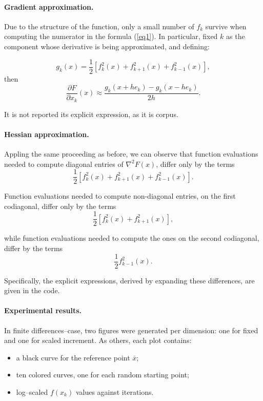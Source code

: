 \documentclass[a4paper,12pt]{article}
\begin{document}
	\vspace{1em}
	
		\paragraph{Gradient approximation.}Due to the structure of the function, only a small number of $f_{k}$ survive when computing the numerator in the formula (\ref{eq1}). In particular, fixed $k$ as the component whose derivative is being approximated, and defining:
	
	\[
	g_{k}(x) = \frac{1}{2}[f^{2}_{k}(x) + f^{2}_{k+1}(x) + f^{2}_{k-1}(x)],
	\]
	then
	\begin{equation}
		\frac{\partial F}{\partial x_{k}}(x) \approx	
			 \frac{g_{k}(x+he_{k}) - g_{k}(x-he_{k})}{2h}.
	\end{equation} 
	
	\noindent It is not reported its explicit expression, as it is corpus. 
	
	\paragraph{Hessian approximation.}
	Appling the same proceeding as before, we can observe that function evaluations needed to compute diagonal entries of $\nabla^{2}F(x)$, differ only by the terms 
	\[	
		\frac{1}{2}[f^{2}_{k}(x) + f^{2}_{k+1}(x) + f^{2}_{k-1}(x)].
	\]
	
	\noindent Function evaluations needed to compute non-diagonal entries, on the first codiagonal, differ only by the terms 
	\[
		\frac{1}{2}[f^{2}_{k}(x) + f^{2}_{k+1}(x)],
	\]
	
	\noindent while function evaluations needed to compute the ones on the second codiagonal, differ by the terms
	 \[
	\frac{1}{2}f^{2}_{k-1}(x).
	\]
	 
	\noindent Specifically, the explicit expressions, derived by expanding these differences, are given in the code.
	
	
	\paragraph{Experimental results.}
	In finite differences--case, two figures were generated per dimension: one for fixed and one for scaled increment. As others, each plot contains:
	\begin{itemize}
		\item a black curve for the reference point \( \bar{x} \);
		\item ten colored curves, one for each random starting point;
		\item log--scaled \( f(x_k) \) values against iterations.
	\end{itemize}
	
\end{document}
